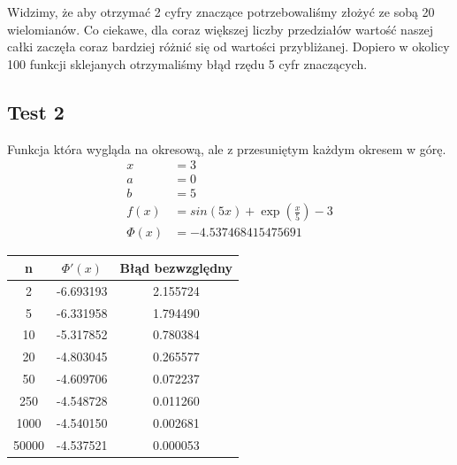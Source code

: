 \documentclass[a4paper]{article}
\begin{document}
    Widzimy, że aby otrzymać 2 cyfry znaczące potrzebowaliśmy złożyć ze sobą 20 wielomianów. Co ciekawe, dla coraz
    większej liczby przedziałów wartość naszej całki zaczęła coraz bardziej różnić się od wartości przybliżanej. Dopiero w okolicy 
    100 funkcji sklejanych otrzymaliśmy błąd rzędu 5 cyfr znaczących.

\newpage
\subsection{Test 2}
    Funkcja która wygląda na okresową, ale z przesuniętym każdym okresem w górę.
    \[
        \begin{aligned}
            x &= 3 \\
            a & = 0 \\
            b &= 5 \\
            f(x) &= sin(5x) + \exp(\frac{x}{5}) - 3 \\
            \Phi(x) &= -4.537468415475691
        \end{aligned}
    \]

    \begin{center}
        \begin{tabular}{|c|c|c|} 
            \hline
            n & $\Phi'(x)$ & Błąd bezwzględny \\
            \hline
            2 & -6.693193 & 2.155724 \\
            \hline
            5 & -6.331958 & 1.794490 \\
            \hline
            10 & -5.317852 & 0.780384 \\
            \hline
            20 & -4.803045 & 0.265577 \\
            \hline
            50 & -4.609706 & 0.072237 \\
            \hline
            250 & -4.548728 & 0.011260 \\
            \hline
            1000 & -4.540150 & 0.002681 \\
            \hline
            50000 & -4.537521 & 0.000053 \\
            \hline
        \end{tabular}
    \end{center}
\end{document}
